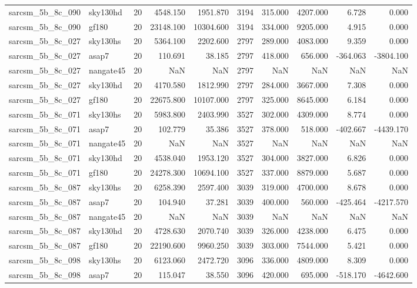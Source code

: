 \documentclass{article}
\begin{document}
\begin{longtable}{llrrrrrrrr}
sarcsm\_5b\_8c\_090 & sky130hd & 20 & 4548.150 & 1951.870 & 3194 & 315.000 & 4207.000 & 6.728 & 0.000 \\
sarcsm\_5b\_8c\_090 & gf180 & 20 & 23148.100 & 10304.600 & 3194 & 334.000 & 9205.000 & 4.915 & 0.000 \\
sarcsm\_5b\_8c\_027 & sky130hs & 20 & 5364.100 & 2202.600 & 2797 & 289.000 & 4083.000 & 9.359 & 0.000 \\
sarcsm\_5b\_8c\_027 & asap7 & 20 & 110.691 & 38.185 & 2797 & 418.000 & 656.000 & -364.063 & -3804.100 \\
sarcsm\_5b\_8c\_027 & nangate45 & 20 & NaN & NaN & 2797 & NaN & NaN & NaN & NaN \\
sarcsm\_5b\_8c\_027 & sky130hd & 20 & 4170.580 & 1812.990 & 2797 & 284.000 & 3667.000 & 7.308 & 0.000 \\
sarcsm\_5b\_8c\_027 & gf180 & 20 & 22675.800 & 10107.000 & 2797 & 325.000 & 8645.000 & 6.184 & 0.000 \\
sarcsm\_5b\_8c\_071 & sky130hs & 20 & 5983.800 & 2403.990 & 3527 & 302.000 & 4309.000 & 8.774 & 0.000 \\
sarcsm\_5b\_8c\_071 & asap7 & 20 & 102.779 & 35.386 & 3527 & 378.000 & 518.000 & -402.667 & -4439.170 \\
sarcsm\_5b\_8c\_071 & nangate45 & 20 & NaN & NaN & 3527 & NaN & NaN & NaN & NaN \\
sarcsm\_5b\_8c\_071 & sky130hd & 20 & 4538.040 & 1953.120 & 3527 & 304.000 & 3827.000 & 6.826 & 0.000 \\
sarcsm\_5b\_8c\_071 & gf180 & 20 & 24278.300 & 10694.100 & 3527 & 337.000 & 8879.000 & 5.687 & 0.000 \\
sarcsm\_5b\_8c\_087 & sky130hs & 20 & 6258.390 & 2597.400 & 3039 & 319.000 & 4700.000 & 8.678 & 0.000 \\
sarcsm\_5b\_8c\_087 & asap7 & 20 & 104.940 & 37.281 & 3039 & 400.000 & 560.000 & -425.464 & -4217.570 \\
sarcsm\_5b\_8c\_087 & nangate45 & 20 & NaN & NaN & 3039 & NaN & NaN & NaN & NaN \\
sarcsm\_5b\_8c\_087 & sky130hd & 20 & 4728.630 & 2070.740 & 3039 & 326.000 & 4238.000 & 6.475 & 0.000 \\
sarcsm\_5b\_8c\_087 & gf180 & 20 & 22190.600 & 9960.250 & 3039 & 303.000 & 7544.000 & 5.421 & 0.000 \\
sarcsm\_5b\_8c\_098 & sky130hs & 20 & 6123.060 & 2472.720 & 3096 & 336.000 & 4809.000 & 8.309 & 0.000 \\
sarcsm\_5b\_8c\_098 & asap7 & 20 & 115.047 & 38.550 & 3096 & 420.000 & 695.000 & -518.170 & -4642.600 \\

\end{longtable}
\end{document}
